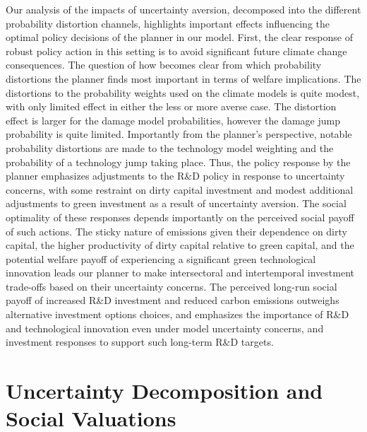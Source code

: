 \documentclass[12pt]{article}
\begin{document}
Our analysis of the impacts of uncertainty aversion, decomposed into the different probability distortion channels, highlights important effects influencing the optimal policy decisions of the planner in our model. First, the clear response of robust policy action in this setting is to avoid significant future climate change consequences. The question of how becomes clear from which probability distortions the planner finds most important in terms of welfare implications. The distortions to the probability weights used on the climate models is quite modest, with only limited effect in either the less or more averse case. The distortion effect is larger for the damage model probabilities, however the damage jump probability is quite limited. Importantly from the planner's perspective, notable probability distortions are made to the technology model weighting and the probability of a technology jump taking place. Thus, the policy response by the planner emphasizes adjustments to the R\&D policy in response to uncertainty concerns, with some restraint on dirty capital investment and modest additional adjustments to green investment as a result of uncertainty aversion. The social optimality of these responses depends importantly on the perceived social payoff of such actions. The sticky nature of emissions given their dependence on dirty capital, the higher productivity of dirty capital relative to green capital, and the potential welfare payoff of experiencing a significant green technological innovation leads our planner to make intersectoral and intertemporal investment trade-offs based on their uncertainty concerns. The perceived long-run social payoff of increased R\&D investment and reduced carbon emissions outweighs alternative investment options choices, and emphasizes the importance of R\&D and technological innovation even under model uncertainty concerns, and investment responses to support such long-term R\&D targets. 


\section{Uncertainty Decomposition and Social Valuations}\label{sec:valuations}
\end{document}
